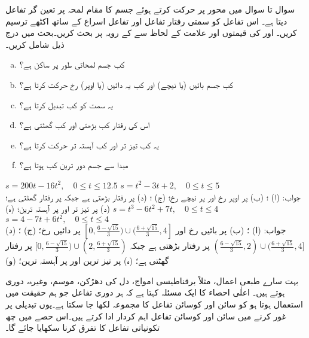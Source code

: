 سوال  تا سوال  میں  محور پر حرکت کرتے ہوئے جسم کا مقام  لمحہ  پر تعین گر تفاعل  دیتا ہے۔ اس تفاعل کو سمتی رفتار تفاعل
  اور تفاعل اسراع  کے ساتھ اکٹھے ترسیم کریں۔ اور  کی قیمتوں اور علامت کے لحاظ سے  کے رویہ پر بحث کریں۔بحث میں درج ذیل شامل کریں۔
\begin{enumerate}[a.]

\item
کب جسم لمحاتی طور پر ساکن ہے؟
\item
کب جسم بائیں (یا نیچے) اور کب یہ دائیں (یا اوپر) رخ حرکت کرتا ہے؟
\item
یہ سمت کو کب تبدیل کرتا ہے؟
\item
اس کی رفتار کب بڑھتی اور کب گھٹتی ہے؟
\item
یہ کب تیز تر اور کب آہستہ تر حرکت کرتا ہے؟
\item
مبدا سے جسم دور ترین کب ہوتا ہے؟ 
\end{enumerate}

$s=200t-16t^2,\quad 0\le t\le 12.5$
$s=t^2-3t+2,\quad 0\le t\le 5$\\
جواب:\quad
(ا) ؛ (ب) \عددی{[ 0,6.25)} پر اوپر رخ اور \عددی{(6.25,12.5]} پر نیچے رخ؛ (ج) ؛ (د) \عددی{(6.25,12.5]} پر رفتار بڑھتی ہے جبکہ \عددی{[ 0,6.25)} پر رفتار گھٹتی ہے؛ (د)  پر تیز تر اور  پر آہستہ ترین؛ (ہ) 
$s=t^3-6t^2+7t,\quad 0\le t\le 4$
$s=4-7t+6t^2,\quad 0\le t\le 4$\\
جواب:\quad 
(ا) ؛  (ب)  پر بائیں رخ  اور 
$[0,\tfrac{6-\sqrt{15}}{3})\cup(\tfrac{6+\sqrt{15}}{3},4]$
 پر دائیں رخ؛ (ج) ؛ (د) 
$(\tfrac{6-\sqrt{15}}{3},2)\cup (\tfrac{6+\sqrt{15}}{3},4]$
پر رفتار بڑھتی ہے جبکہ 
$[0,\tfrac{6-\sqrt{15}}{3})\cup (2,\tfrac{6+\sqrt{15}}{3})$
 پر رفتار گھٹتی ہے؛ (ہ)  پر تیز ترین اور  پر آہستہ ترین؛ (و) 

بہت سارے طبعی اعمال، مثلاً برقناطیسی امواج، دل کی دھڑکن، موسم، وغیرہ، دوری ہوتے ہیں۔ اعلٰی احصاء کا ایک مسئلہ کہتا ہے کہ ہر دوری تفاعل جو ہم حقیقت میں استعمال ہوتا ہو کو سائن اور کوسائن تفاعل کا مجموعہ لکھا جا سکتا ہے۔یوں تبدیلی پر غور کرنے میں سائن اور کوسائن تفاعل اہم کردار ادا کرتے ہیں۔اس حصے میں چھ تکونیاتی تفاعل کا تفرق کرنا سکھایا جائے گا۔

